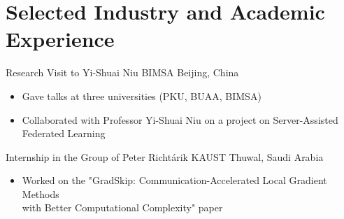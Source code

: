 \documentclass[10pt,a4paper,sans]{moderncv}        %
\newcommand{\peter}{Peter Richtárik}
\newcommand{\grigoryan}{Martin Grigoryan}
\newcommand{\kaust}{KAUST}
\newcommand{\yerevann}{YerevaNN}
\newcommand{\yerevan}{Yerevan, Armenia}
\newcommand{\thuwal}{Thuwal, Saudi Arabia}
\newcommand{\ysu}{Yerevan State University}
\begin{document}
\vspace{-1em}
\section{Selected Industry and Academic Experience}

{Research Visit to Yi-Shuai Niu}
{BIMSA}
{Beijing, China}
{}
{
  \begin{itemize}
    \item Gave talks at three universities (PKU, BUAA, BIMSA)
    \item Collaborated with Professor Yi-Shuai Niu on a project on Server-Assisted Federated Learning
  \end{itemize}
}


{Internship in the Group of \peter}
{\kaust}
{\thuwal}
{}
{
  \begin{itemize}
    \item Worked on the "GradSkip: Communication-Accelerated Local Gradient Methods\\ with Better Computational Complexity" paper
  \end{itemize}
}



\end{document}
